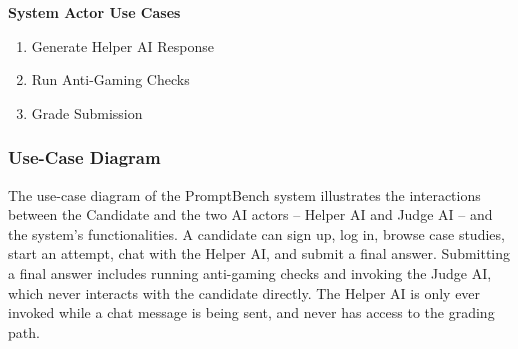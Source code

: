 \documentclass[11pt]{article}
\begin{document}
\textbf{System Actor Use Cases}
\begin{enumerate}[nosep,start=8]
  \item Generate Helper AI Response
  \item Run Anti-Gaming Checks
  \item Grade Submission
\end{enumerate}

\subsubsection{Use-Case Diagram}

The use-case diagram of the PromptBench system illustrates the interactions between the
Candidate and the two AI actors -- Helper AI and Judge AI -- and the system's functionalities.
A candidate can sign up, log in, browse case studies, start an attempt, chat with the Helper
AI, and submit a final answer. Submitting a final answer includes running anti-gaming checks
and invoking the Judge AI, which never interacts with the candidate directly. The Helper AI is
only ever invoked while a chat message is being sent, and never has access to the grading
path.
\end{document}
